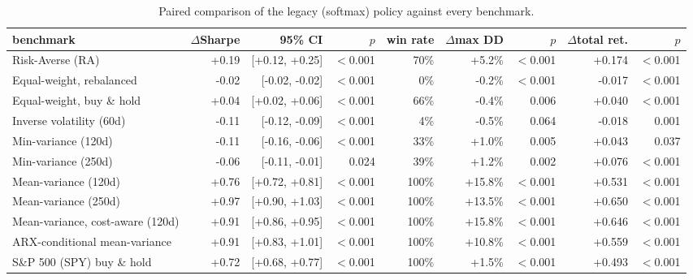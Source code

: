 \begin{table}[ht!]
\centering
\footnotesize
\setlength{\tabcolsep}{4pt}
\begin{tabular}{lrrrrrrrr}
\hline
benchmark & $\Delta$Sharpe & 95\% CI & $p$ & win rate & $\Delta$max DD & $p$ & $\Delta$total ret. & $p$ \\
\hline
Risk-Averse (RA) & +0.19 & [+0.12, +0.25] & $<$0.001 & 70\% & +5.2\% & $<$0.001 & +0.174 & $<$0.001 \\
Equal-weight, rebalanced & -0.02 & [-0.02, -0.02] & $<$0.001 & 0\% & -0.2\% & $<$0.001 & -0.017 & $<$0.001 \\
Equal-weight, buy \& hold & +0.04 & [+0.02, +0.06] & $<$0.001 & 66\% & -0.4\% & 0.006 & +0.040 & $<$0.001 \\
Inverse volatility (60d) & -0.11 & [-0.12, -0.09] & $<$0.001 & 4\% & -0.5\% & 0.064 & -0.018 & 0.001 \\
Min-variance (120d) & -0.11 & [-0.16, -0.06] & $<$0.001 & 33\% & +1.0\% & 0.005 & +0.043 & 0.037 \\
Min-variance (250d) & -0.06 & [-0.11, -0.01] & 0.024 & 39\% & +1.2\% & 0.002 & +0.076 & $<$0.001 \\
Mean-variance (120d) & +0.76 & [+0.72, +0.81] & $<$0.001 & 100\% & +15.8\% & $<$0.001 & +0.531 & $<$0.001 \\
Mean-variance (250d) & +0.97 & [+0.90, +1.03] & $<$0.001 & 100\% & +13.5\% & $<$0.001 & +0.650 & $<$0.001 \\
Mean-variance, cost-aware (120d) & +0.91 & [+0.86, +0.95] & $<$0.001 & 100\% & +15.8\% & $<$0.001 & +0.646 & $<$0.001 \\
ARX-conditional mean-variance & +0.91 & [+0.83, +1.01] & $<$0.001 & 100\% & +10.8\% & $<$0.001 & +0.559 & $<$0.001 \\
S\&P 500 (SPY) buy \& hold & +0.72 & [+0.68, +0.77] & $<$0.001 & 100\% & +1.5\% & $<$0.001 & +0.493 & $<$0.001 \\
\hline
\end{tabular}
\caption{Paired comparison of the legacy (softmax) policy against every benchmark.}
\label{tab:bench_paired_softmax_bear2022}
\end{table}
